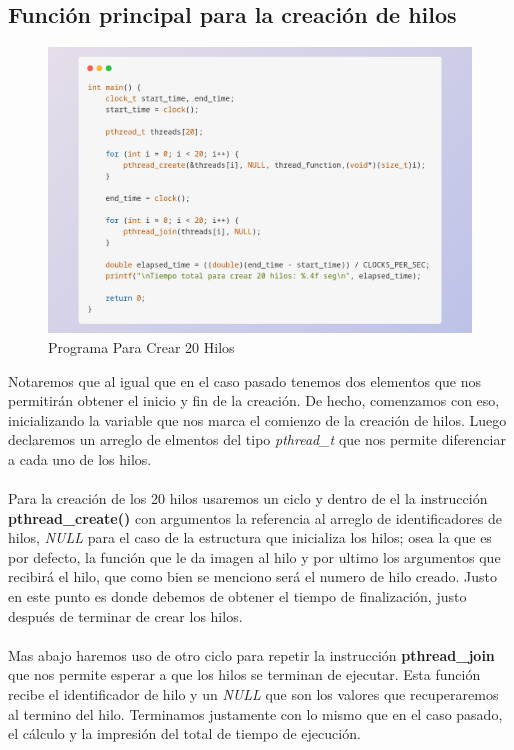 \documentclass[10pt]{article}
\begin{document}
	\subsection{Función principal para la creación de hilos}
	\begin{figure}[h!]
		\centering
		\includegraphics[width=\linewidth]{pvh2.png}
		\caption{Programa Para Crear 20 Hilos}
		\label{fig:pvh2}
	\end{figure}
	Notaremos que al igual que en el caso pasado tenemos dos elementos que nos permitirán obtener el inicio y fin de la creación. De hecho, comenzamos con eso,  inicializando  la variable que nos marca el comienzo de la creación de hilos. Luego declaremos un arreglo de elmentos del tipo \textit{pthread\_t} que nos permite diferenciar a cada uno de los hilos. 
	\\\\
	Para la creación de los 20 hilos usaremos un ciclo y dentro de el la instrucción \textbf{pthread\_create()} con argumentos la referencia al arreglo de identificadores de hilos, \textit{NULL} para el caso de la estructura que inicializa los hilos; osea la que es por defecto, la función que le da imagen al hilo y por ultimo los argumentos que recibirá el hilo, que como bien se menciono será el numero de hilo creado. Justo en este punto es donde debemos de obtener el tiempo de finalización, justo después de terminar de crear los hilos. 
	\\\\
	Mas abajo haremos uso de otro ciclo para repetir la instrucción \textbf{pthread\_join} que nos permite esperar a que los hilos se terminan de ejecutar. Esta función recibe el identificador de hilo y un \textit{NULL} que son los valores que recuperaremos al termino del hilo. Terminamos justamente con lo mismo que en el caso pasado, el cálculo y la impresión del total de tiempo de ejecución. 
\end{document}
